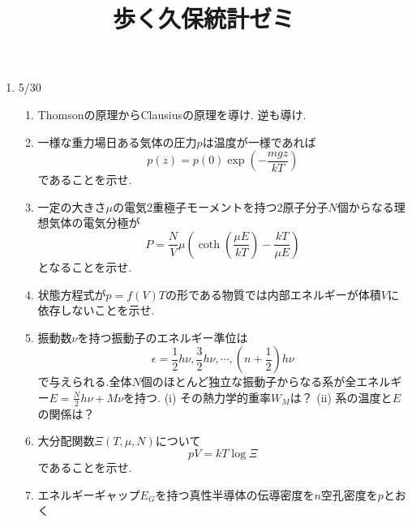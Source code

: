 \documentclass[11pt,a4paper]{jarticle}
\title{歩く久保統計ゼミ}
\author{}
\date{}
\begin{document}
\maketitle
\begin{enumerate}
    \item 5/30
    \begin{enumerate}
        \item Thomsonの原理からClausiusの原理を導け. 逆も導け.
        \item 一様な重力場日ある気体の圧力$p$は温度が一様であれば
        \begin{equation}
            p(z)=p(0)\exp(-\frac{mgz}{kT})
        \end{equation}
        であることを示せ.
        \item 一定の大きさ$\mu$の電気2重極子モーメントを持つ2原子分子$N$個からなる理想気体の電気分極が
        \begin{equation*}
            P=\frac{N}{V}\mu(\coth(\frac{\mu E}{kT})-\frac{kT}{\mu E})
        \end{equation*}
        となることを示せ.
        \item 状態方程式が$p=f(V)T$の形である物質では内部エネルギーが体積$V$に依存しないことを示せ.
        \item 振動数$\nu$を持つ振動子のエネルギー準位は
        \begin{equation*}
            \epsilon = \frac{1}{2}h\nu, \frac{3}{2}h\nu, \cdots ,(n+\frac{1}{2})h\nu
        \end{equation*}
        で与えられる.全体$N$個のほとんど独立な振動子からなる系が全エネルギー$E=\frac{N}{2}h\nu+M\nu$を持つ.
        (i) その熱力学的重率$W_M$は？
        (ii) 系の温度と$E$の関係は？
        \item 大分配関数$\Xi(T,\mu, N)$について
        \begin{equation*}
            pV=kT\log\Xi
        \end{equation*}
        であることを示せ.
        \item エネルギーギャップ$E_G$を持つ真性半導体の伝導密度を$n$空孔密度を$p$とおく
    \end{enumerate}
\end{enumerate}
\end{document}
